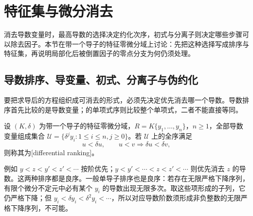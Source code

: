 
\section{特征集与微分消去}
\label{b3:sec:E03}

消去导数变量时，最高导数的选择决定约化次序，初式与分离子则决定哪些步骤可以除去因子。本节在带一个导子的特征零微分域上讨论：先把这种选择写成排序与特征集，再说明局部化后被倒置因子的零点分支为何仍须处理。


\subsection{导数排序、导变量、初式、分离子与伪约化}
\label{b3:subsec:E03:01}

要把求导后的方程组织成可消去的形式，必须先决定优先消去哪一个导数。导数排序首先比较的是导数变量；的单项式序则比较整个单项式，二者不能直接等同。

\begin{definition}\label{b3:def:differential-ranking}
	设 \((K,\delta)\) 为带一个导子的特征零微分域，\(R=K\{y_1,\ldots,y_n\}\)，\(n\ge1\)，全部导数变量组成集合 \(\mathcal U=\{\delta^jy_i:1\le i\le n,j\ge0\}\)。若 \(\mathcal U\) 上的全序满足
	\[
		u<\delta u,\qquad u<v\Longrightarrow\delta u<\delta v,
	\]
	则称其为[differential ranking]。
\end{definition}

例如 \(y<z<y'<z'<\cdots\) 按阶优先；\(y<y'<\cdots<z<z'<\cdots\) 则优先消去 \(z\) 的导数。这两种排序都是良序。一般单导子排序也是良序：若存在无限严格下降序列，有限个微分不定元中必有某个 \(y_i\) 的导数出现无限多次。取这些项形成的子列，它仍严格下降；但 \(y_i<\delta y_i<\delta^2y_i<\cdots\)，所以对应导数阶数须形成非负整数的无限严格下降序列，不可能。

